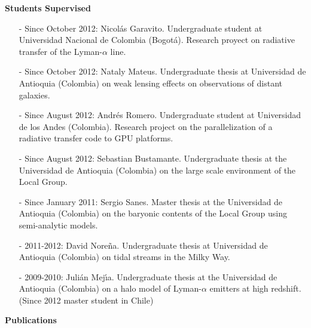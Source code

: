\documentclass[9pt]{article}
\begin{document}
{\bf Students Supervised}
\begin{itemize}

\item[-] Since October 2012: Nicol\'as Garavito. Undergraduate student at Universidad Nacional de Colombia (Bogot\'a). Research proyect on radiative transfer of the Lyman-$\alpha$ line.
\item[-] Since October 2012: Nataly Mateus. Undergraduate thesis at Universidad de Antioquia (Colombia) on weak lensing effects on observations of distant galaxies.
\item[-] Since August 2012: Andr\'es Romero. Undergraduate student at Universidad de los Andes (Colombia). Research project on the parallelization of a radiative transfer code to GPU platforms.
\item[-] Since August 2012: Sebastian Bustamante. Undergraduate thesis at the Universidad de Antioquia (Colombia) on the large scale environment of the Local Group.
\item[-] Since January 2011: Sergio Sanes. Master thesis at the Universidad de Antioquia (Colombia) on the baryonic contents of the Local Group using semi-analytic models.
\item[-]2011-2012: David Nore\~na. Undergraduate thesis at Universidad de Antioquia (Colombia) on tidal streams in the Milky Way.
\item[-]2009-2010: Juli\'an Mej\'{\i}a. Undergraduate thesis at the Universidad de Antioquia (Colombia) on a halo model of Lyman-$\alpha$ emitters at high redshift. (Since 2012 master student in Chile)
\end{itemize}

\newpage
{\bf Publications}\\
\end{document}
